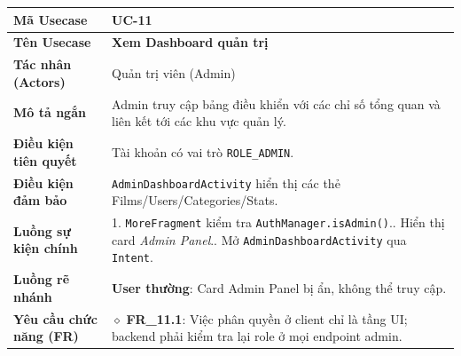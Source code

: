\begin{table}[H]
\renewcommand{\arraystretch}{1.3}
\centering
\begin{tabularx}{\textwidth}{|p{4.5cm}|X|}
\hline
\cellcolor{gray!15}\bfseries Mã Usecase & \textbf{UC-11} \\ \hline
\cellcolor{gray!15}\bfseries Tên Usecase & \textbf{Xem Dashboard quản trị} \\ \hline
\cellcolor{gray!15}\bfseries Tác nhân (Actors) & Quản trị viên (Admin) \\ \hline
\cellcolor{gray!15}\bfseries Mô tả ngắn & Admin truy cập bảng điều khiển với các chỉ số tổng quan và liên kết tới các khu vực quản lý. \\ \hline
\cellcolor{gray!15}\bfseries Điều kiện tiên quyết & Tài khoản có vai trò \texttt{ROLE\_ADMIN}. \\ \hline
\cellcolor{gray!15}\bfseries Điều kiện đảm bảo & \texttt{AdminDashboardActivity} hiển thị các thẻ Films/Users/Categories/Stats. \\ \hline
\cellcolor{gray!15}\bfseries Luồng sự kiện chính & 1. \texttt{MoreFragment} kiểm tra \texttt{AuthManager.isAdmin()}.\newline 2. Hiển thị card \textit{Admin Panel}.\newline 3. Mở \texttt{AdminDashboardActivity} qua \texttt{Intent}. \\ \hline
\cellcolor{gray!15}\bfseries Luồng rẽ nhánh & \textbf{User thường}: Card Admin Panel bị ẩn, không thể truy cập. \\ \hline
\cellcolor{gray!15}\bfseries Yêu cầu chức năng (FR) & $\diamond$ \textbf{FR\_11.1}: Việc phân quyền ở client chỉ là tầng UI; backend phải kiểm tra lại role ở mọi endpoint admin. \\ \hline
\end{tabularx}
\end{table}


